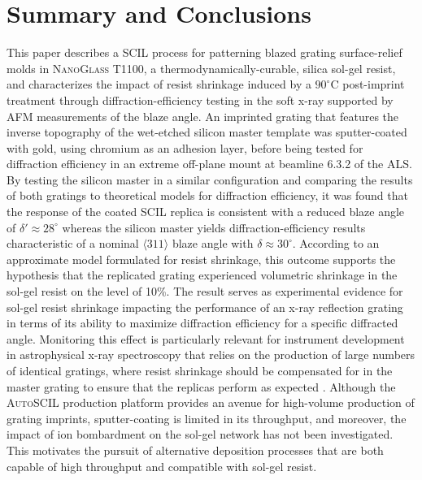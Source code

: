 \documentclass{osa-article}
\begin{document}
\section{Summary and Conclusions}\label{sec:conclusion}
This paper describes a SCIL process for patterning blazed grating surface-relief molds in \textsc{NanoGlass T1100}, a thermodynamically-curable, silica sol-gel resist, and characterizes the impact of resist shrinkage induced by a $90^{\circ}$C post-imprint treatment through diffraction-efficiency testing in the soft x-ray supported by AFM measurements of the blaze angle. 
An imprinted grating that features the inverse topography of the wet-etched silicon master template was sputter-coated with gold, using chromium as an adhesion layer, before being tested for diffraction efficiency in an extreme off-plane mount at beamline 6.3.2 of the ALS. 
By testing the silicon master in a similar configuration and comparing the results of both gratings to theoretical models for diffraction efficiency, it was found that the response of the coated SCIL replica is consistent with a reduced blaze angle of $\delta' \approx 28^{\circ}$ whereas the silicon master yields diffraction-efficiency results characteristic of a nominal $\langle 311 \rangle$ blaze angle with $\delta \approx 30^{\circ}$. 
According to an approximate model formulated for resist shrinkage, this outcome supports the hypothesis that the replicated grating experienced volumetric shrinkage in the sol-gel resist on the level of 10\%. 
The result serves as experimental evidence for sol-gel resist shrinkage impacting the performance of an x-ray reflection grating in terms of its ability to maximize diffraction efficiency for a specific diffracted angle. 
Monitoring this effect is particularly relevant for instrument development in astrophysical x-ray spectroscopy that relies on the production of large numbers of identical gratings, where resist shrinkage should be compensated for in the master grating to ensure that the replicas perform as expected \cite{Miles19b,Tutt18,McEntaffer19}. 
Although the \textsc{AutoSCIL} production platform provides an avenue for high-volume production of grating imprints, sputter-coating is limited in its throughput, and moreover, the impact of ion bombardment on the sol-gel network has not been investigated. 
This motivates the pursuit of alternative deposition processes that are both capable of high throughput and compatible with sol-gel resist.  
\end{document}
